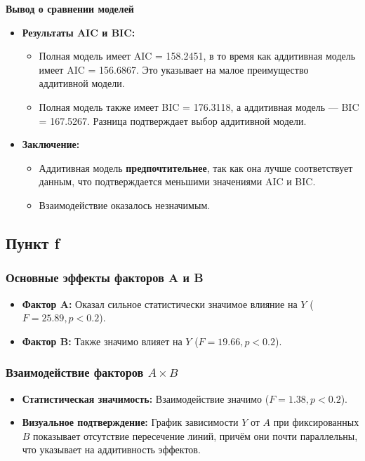 \documentclass[12pt]{spbstu-task}
\begin{document}
\textbf{Вывод о сравнении моделей}

\begin{itemize}
\item \textbf{Результаты AIC и BIC:}
\begin{itemize}
\item Полная модель имеет AIC = 158.2451, в то время как аддитивная
модель имеет AIC = 156.6867.  Это указывает на малое преимущество
аддитивной модели.
\item Полная модель также имеет BIC = 176.3118, а аддитивная модель ---
BIC = 167.5267.  Разница подтверждает выбор аддитивной модели.
\end{itemize}
\item \textbf{Заключение:}
\begin{itemize}
\item Аддитивная модель \textbf{предпочтительнее}, так как она лучше соответствует
данным, что подтверждается меньшими значениями AIC и BIC.
\item Взаимодействие оказалось незначимым.
\end{itemize}
\end{itemize}
\subsection{Пункт f}
\label{sec:org3c84685}
\subsubsection{Основные эффекты факторов A и B}
\label{sec:org4a3e25d}
\begin{itemize}
\item \textbf{Фактор A:} Оказал сильное статистически значимое влияние на \(Y\)
(\(F = 25.89, p < 0.2\)).
\item \textbf{Фактор B:} Также значимо влияет на \(Y\) (\(F = 19.66, p < 0.2\)).
\end{itemize}
\subsubsection{Взаимодействие факторов \(A \times B\)}
\label{sec:org9af8c53}
\begin{itemize}
\item \textbf{Статистическая значимость:} Взаимодействие значимо (\(F = 1.38, p <
  0.2\)).
\item \textbf{Визуальное подтверждение:} График зависимости \(Y\) от \(A\) при
фиксированных \(B\) показывает отсутствие пересечение линий, причём
они почти параллельны, что указывает на аддитивность эффектов.
\end{itemize}
\end{document}
